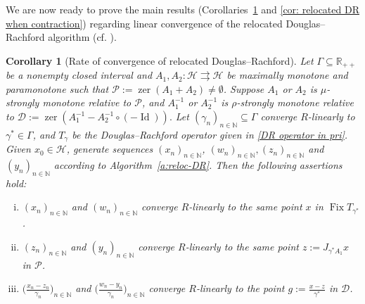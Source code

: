 \documentclass[a4paper,12pt]{article}
\newtheorem{corollary}[theorem]{Corollary}
\DeclareMathOperator{\Id}{Id}
\DeclareMathOperator{\Fix}{Fix}
\DeclareMathOperator{\zer}{zer}
\newcommand{\setto}{\rightrightarrows}
\begin{document}
We are now ready to prove the main results (Corollaries~\ref{cor: DR error bound} and \ref{cor: relocated DR when contraction})  regarding linear convergence of the relocated Douglas--Rachford algorithm (cf. \cite[Corollary 4.11]{atenas2025relocated}).  
\begin{corollary}[Rate of convergence of relocated Douglas--Rachford]\label{cor: DR error bound}
    Let $\Gamma\subseteq\mathbb{R}_{++}$ be a nonempty closed interval and $A_1,A_2\colon\mathcal{H}\setto\mathcal{H}$ be maximally monotone and paramonotone such that $\mathcal{P}:=\zer(A_1+A_2)\neq\emptyset$. Suppose $A_1$ or $A_2$ is $\mu$-strongly monotone relative to $\mathcal{P}$, and $A_1^{-1}$ or $A_2^{-1}$ is $\rho$-strongly monotone relative to $\mathcal{D}:=\zer(A_1^{-1} - A_2^{-1} \circ (- \Id)).$ Let $(\gamma_n)_{n\in\mathbb{N}}\subseteq\Gamma$ converge $R$-linearly to $\gamma^*\in\Gamma$, and $T_\gamma$ be the Douglas--Rachford operator given in \eqref{DR operator in pri}. Given $x_0\in\mathcal{H}$, generate sequences $(x_n)_{n\in\mathbb{N}}$, $(w_n)_{n\in\mathbb{N}}, (z_n)_{n\in\mathbb{N}}$ and $(y_n)_{n\in\mathbb{N}}$ according to Algorithm~\ref{a:reloc-DR}. Then the following assertions hold:
\begin{enumerate}[(i)]
    \item \label{cor:fixed-point-convergence} $(x_n)_{n\in\mathbb{N}}$ and $(w_n)_{n\in\mathbb{N}}$ converge  $R$-linearly to the same point $x$ in $\Fix T_{\gamma^*}$.
    \item \label{cor:primal-convergence} $(z_n)_{n\in\mathbb{N}}$ and $(y_n)_{n\in\mathbb{N}}$ converge  $R$-linearly to the same point $z := J_{\gamma^*A_1}x$ in $\mathcal{P}$.
    
    \item \label{cor:dual-convergence} $\bigl(\frac{x_n - z_n}{\gamma_n}\bigr)_{n\in\mathbb{N}}$ and $\bigl(\frac{w_n - y_n}{\gamma_n}\bigr)_{n\in\mathbb{N}}$  converge $R$-linearly to the  point $g := \frac{x - z}{\gamma^*}$ in $\mathcal{D}$. 
\end{enumerate}
\end{corollary}
\end{document}
